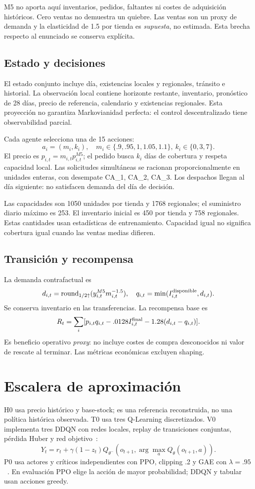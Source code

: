 \documentclass[conference]{IEEEtran}
\begin{document}
M5 no aporta aquí inventarios, pedidos, faltantes ni costes de adquisición históricos. Cero ventas no demuestra un quiebre. Las ventas son un proxy de demanda y la elasticidad de 1.5 por tienda es \emph{supuesta}, no estimada. Esta brecha respecto al enunciado se conserva explícita.

\subsection{Estado y decisiones}
El estado conjunto incluye día, existencias locales y regionales, tránsito e historial. La observación local contiene horizonte restante, inventario, pronóstico de 28 días, precio de referencia, calendario y existencias regionales. Esta proyección no garantiza Markovianidad perfecta: el control descentralizado tiene observabilidad parcial.

Cada agente selecciona una de 15 acciones:
\[
a_i=(m_i,k_i),\quad m_i\in\{.9,.95,1,1.05,1.1\},\
k_i\in\{0,3,7\}.
\]
El precio es $p_{i,t}=m_{i,t}p^{M5}_{i,t}$; el pedido busca $k_i$ días de cobertura y respeta capacidad local. Las solicitudes simultáneas se racionan proporcionalmente en unidades enteras, con desempate CA\_1, CA\_2, CA\_3. Los despachos llegan al día siguiente: no satisfacen demanda del día de decisión.

Las capacidades son 1050 unidades por tienda y 1768 regionales; el suministro diario máximo es 253. El inventario inicial es 450 por tienda y 758 regionales. Estas cantidades usan estadísticas de entrenamiento. Capacidad igual no significa cobertura igual cuando las ventas medias difieren.

\subsection{Transición y recompensa}
La demanda contrafactual es
\[
d_{i,t}=\operatorname{round}_{1/2\uparrow}
(y^{M5}_{i,t}m_{i,t}^{-1.5}),\quad
q_{i,t}=\min(I^{\rm disponible}_{i,t},d_{i,t}).
\]
Se conserva inventario en las transferencias. La recompensa base es
\[
R_t=\sum_i[p_{i,t}q_{i,t}-.0128 I^{\rm final}_{i,t}
-1.28(d_{i,t}-q_{i,t})].
\]
Es beneficio operativo \emph{proxy}: no incluye costes de compra desconocidos ni valor de rescate al terminar. Las métricas económicas excluyen shaping.

\section{Escalera de aproximación}
H0 usa precio histórico y base-stock; es una referencia reconstruida, no una política histórica observada. T0 usa tres Q-Learning discretizados. V0 implementa tres DDQN con redes locales, replay de transiciones conjuntas, pérdida Huber y red objetivo~\cite{ddqn}:
\[
Y_t=r_t+\gamma(1-z_t)
Q_{\theta^-}(o_{t+1},\arg\max_a Q_\theta(o_{t+1},a)).
\]
P0 usa actores y críticos independientes con PPO, clipping .2 y GAE con $\lambda=.95$~\cite{ppo}. En evaluación PPO elige la acción de mayor probabilidad; DDQN y tabular usan acciones greedy.
\end{document}
